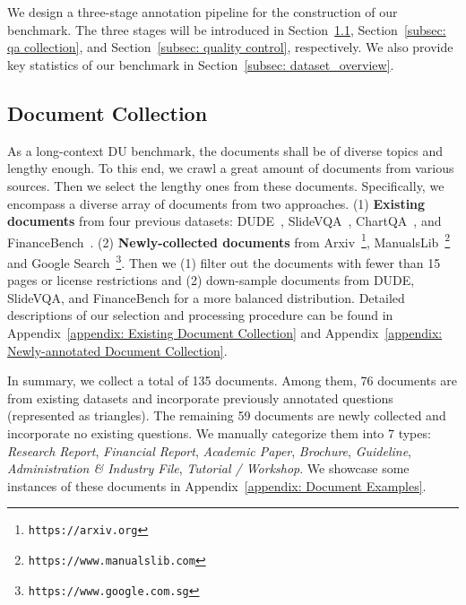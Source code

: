 \section{\benchmarkname}
\label{sec: dataset}
We design a three-stage annotation pipeline for the construction of our benchmark. The three stages will be introduced in Section~\ref{subsec: document collection}, Section~\ref{subsec: qa collection}, and Section~\ref{subsec: quality control}, respectively. We also provide key statistics of our benchmark in Section~\ref{subsec: dataset_overview}.


\subsection{Document Collection}
\label{subsec: document collection}
As a long-context DU benchmark, the documents shall be of diverse topics and lengthy enough. To this end, we crawl a great amount of documents from various sources. Then we select the lengthy ones from these documents. Specifically, we encompass a diverse array of documents from two approaches. (1) \textbf{Existing documents} from four previous datasets: DUDE~\cite{VanLandeghem2023DocumentUD}, SlideVQA~\cite{SlideVQA2023}, ChartQA~\cite{masry-etal-2022-chartqa}, and FinanceBench~\cite{islam2023financebench}. (2) \textbf{Newly-collected documents} from Arxiv~\footnote{\texttt{https://arxiv.org}}, ManualsLib~\footnote{\texttt{https://www.manualslib.com}} and Google Search~\footnote{\texttt{https://www.google.com.sg}}. Then we (1) filter out the documents with fewer than 15 pages or license restrictions and (2) down-sample documents from DUDE, SlideVQA, and FinanceBench for a more balanced distribution. Detailed descriptions of our selection and processing procedure can be found in Appendix~\ref{appendix: Existing Document Collection} and Appendix~\ref{appendix: Newly-annotated Document Collection}.

In summary, we collect a total of 135 documents. Among them, 76 documents are from existing datasets 
and incorporate previously annotated questions (represented as triangles). The remaining 59 documents are newly collected 
and incorporate no existing questions. We manually categorize them into 7 types: \textit{Research Report}, \textit{Financial Report}, \textit{Academic Paper}, \textit{Brochure}, \textit{Guideline}, \textit{Administration \& Industry File}, \textit{Tutorial / Workshop}. We showcase some instances of these documents in Appendix~\ref{appendix: Document Examples}.


